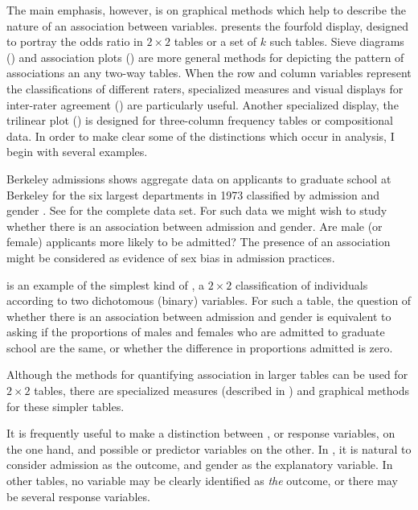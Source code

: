 The main emphasis, however, is on graphical methods which help
to describe the nature of an association between variables.
 presents the fourfold display,
designed to portray the odds ratio in $2 \times 2$ tables or a set
of $k$ such tables.
Sieve diagrams () and association plots
() are more general methods for depicting
the pattern of associations an any two-way tables.
When the row and column variables represent the classifications
of different raters, specialized measures and visual displays
for inter-rater agreement () are particularly
useful.
Another specialized display, the trilinear plot ()
is designed
for three-column frequency tables or compositional data.
In order to make clear some of the distinctions which occur in
\ctab{} analysis, I begin with several examples.

\begin{Example}[berkeley1]{Berkeley admissions}
 shows aggregate data on applicants to
graduate school at Berkeley for the six largest departments in 1973
classified by admission and gender
\citep{Bickel-etal:75}.
See  for the complete data set.
For such data we might wish to study whether there is an association
between admission and gender.
Are male (or female) applicants more likely to be admitted?
The presence of an association might be considered as
evidence of sex bias in admission practices.

 is an example of the simplest kind of \ctab,
a $2 \times 2$ classification of individuals according to two
dichotomous (binary) variables.
For such a table, the question of whether there is an association
between admission and gender is equivalent to asking if the
proportions of males and females who are admitted to graduate
school are the same, or whether the difference in proportions
admitted is zero.

\end{Example}

Although the methods for quantifying association in larger tables can be
used for $2 \times 2$ tables, there are specialized measures
(described in ) and
graphical methods for these simpler tables.

It is frequently useful to make a distinction between ,
or response variables, on the one hand, and possible 
or predictor variables on the other.
In , it is natural to consider admission
as the outcome, and gender as the explanatory variable.
In other tables, no variable may be clearly identified as \emph{the}
outcome, or there may be several response variables.

